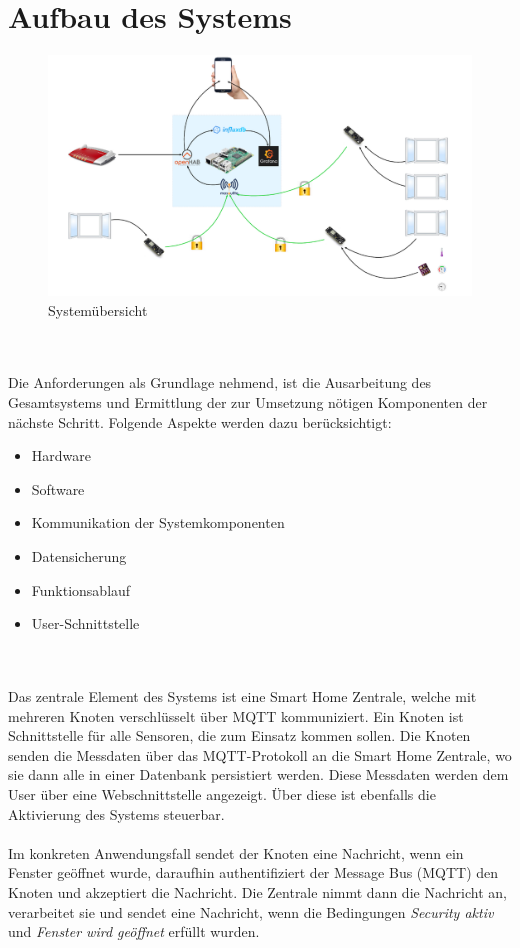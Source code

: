 \documentclass[a4paper,10pt,twocolumn]{article}
\begin{document}
\section{Aufbau des Systems}
\begin{figure}[htb!]
\centering
\includegraphics[width = (\textwidth)/2]{images/systemuebersicht.png}
\caption{Systemübersicht}
\label{fig:systemuebersicht}
\end{figure}\\\\
Die Anforderungen als Grundlage nehmend, ist die Ausarbeitung des Gesamtsystems und Ermittlung der zur Umsetzung nötigen Komponenten der nächste Schritt.
Folgende Aspekte werden dazu berücksichtigt:
\begin{itemize}
    \item Hardware
    \item Software
    \item Kommunikation der Systemkomponenten
    \item Datensicherung
    \item Funktionsablauf
    \item User-Schnittstelle
\end{itemize}\\\\
Das zentrale Element des Systems ist eine Smart Home Zentrale, welche mit mehreren Knoten verschlüsselt über \ac{MQTT} kommuniziert. Ein Knoten ist Schnittstelle für alle Sensoren, die zum Einsatz kommen sollen. Die Knoten senden die Messdaten über das MQTT-Protokoll an die Smart Home Zentrale, wo sie dann alle in einer Datenbank persistiert werden. Diese Messdaten werden dem User über eine Webschnittstelle angezeigt. Über diese ist ebenfalls die Aktivierung des Systems steuerbar.\\\\
Im konkreten Anwendungsfall sendet der Knoten eine  Nachricht, wenn ein Fenster geöffnet wurde, daraufhin authentifiziert der Message Bus (MQTT) den Knoten und akzeptiert die Nachricht. Die Zentrale nimmt dann die Nachricht an, verarbeitet sie und sendet eine Nachricht, wenn die Bedingungen \textit{Security aktiv} und \textit{Fenster wird geöffnet} erfüllt wurden.
\end{document}
